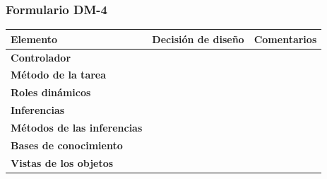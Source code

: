 \documentclass[a4paper,11pt]{article}
\begin{document}
			\subsubsection{Formulario DM-4}
			\begin{center}
				\begin{tabular}{| l | l | l |}
					\hline
					\textbf{Elemento} & \textbf{Decisión de diseño} & \textbf{Comentarios} \\
					\hline
					\textbf{Controlador} &  & \\
					\hline
					\textbf{Método de la tarea} &  & \\
					\hline
					\textbf{Roles dinámicos} &  & \\
					\hline
					\textbf{Inferencias} &  & \\
					\hline
					\textbf{Métodos de las inferencias} &  & \\
					\hline
					\textbf{Bases de conocimiento} &  & \\
					\hline
					\textbf{Vistas de los objetos} &  & \\
					\hline
				\end{tabular}
			\end{center}
\end{document}

